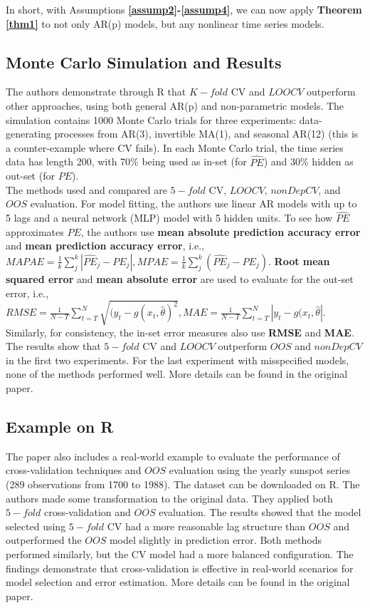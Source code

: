 \documentclass[12pt, oneside]{amsart}
\theoremstyle{definition}
\theoremstyle{remark}
\numberwithin{equation}{section}
\begin{document}
In short, with Assumptions \textbf{\ref{assump2}-\ref{assump4}}, we can now apply \textbf{Theorem \ref{thm1}} to not only AR(p) models, but any nonlinear time series models.


\subsection{Monte Carlo Simulation and Results}
The authors demonstrate through R that $K-fold$ CV and $LOOCV$ outperform other approaches, using both general AR(p) and non-parametric models. The simulation contains 1000 Monte Carlo trials for three experiments: data-generating processes from AR(3), invertible MA(1), and seasonal AR(12) (this is a counter-example where CV fails). In each Monte Carlo trial, the time series data has length 200, with 70\% being used as in-set (for $\hat{PE}$) and 30\% hidden as out-set (for $PE$).\\

The methods used and compared are $5-fold$ CV, $LOOCV$, $nonDepCV$, and $OOS$ evaluation. For model fitting, the authors use linear AR models with up to 5 lags and a neural network (MLP) model with 5 hidden units.
To see how $\hat{PE}$ approximates $PE$, the authors use \textbf{mean absolute prediction accuracy error} and \textbf{mean prediction accuracy error}, i.e., $MAPAE = \frac{1}{k} \sum_j^k | \hat{PE}_j - PE_j|, MPAE = \frac{1}{k} \sum_j^k ( \hat{PE}_j - PE_j)$.
\textbf{Root mean squared error} and \textbf{mean absolute error} are used to evaluate for the out-set error, i.e., $RMSE = \frac{1}{N-T} \sum_{t=T}^N \sqrt{(y_t - g(x_t, \hat{\theta})^2}, MAE = \frac{1}{N-T} \sum_{t=T}^N |y_t - g(x_t, \hat{\theta}|$. Similarly, for consistency, the in-set error measures also use \textbf{RMSE} and \textbf{MAE}.\\

The results show that $5-fold$ CV and $LOOCV$ outperform $OOS$ and $nonDepCV$ in the first two experiments. For the last experiment with misspecified models, none of the methods performed well. More details can be found in the original paper.

\subsection{Example on R}
The paper also includes a real-world example to evaluate the performance of cross-validation techniques and $OOS$ evaluation using the yearly sunspot series (289 observations from 1700 to 1988). The dataset can be downloaded on R. The authors made some transformation to the original data. They applied both $5-fold$ cross-validation and $OOS$ evaluation. The results showed that the model selected using $5-fold$ CV had a more reasonable lag structure than $OOS$ and outperformed the $OOS$ model slightly in prediction error. Both methods performed similarly, but the CV model had a more balanced configuration. The findings demonstrate that cross-validation is effective in real-world scenarios for model selection and error estimation. More details can be found in the original paper.
\end{document}
